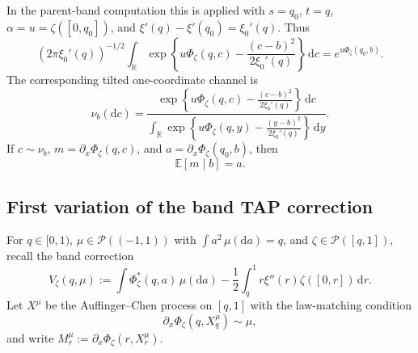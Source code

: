 \documentclass[a4paper,10pt,reqno]{amsart}
\numberwithin{equation}{section}
\newcommand{\dR}{\mathbb{R}}%
\newcommand{\dE}{\mathbb{E}}%
\newcommand{\mc}{\mathcal}
\newcommand{\dd}{\mathrm{d}}
\begin{document}
	In the parent-band computation this is applied with $s=q_0$, $t=q$, $\alpha=u=\zeta([0,q_0])$, and $\xi'(q)-\xi'(q_0)=\xi_0'(q)$.  Thus
	\begin{equation}\label{eq:band-cole-hopf-collapse}
		(2\pi\xi_0'(q))^{-1/2}
		\int_\dR
		\exp\left\{
		u\Phi_\zeta(q,c)-\frac{(c-b)^2}{2\xi_0'(q)}
		\right\}\,\dd c
		=e^{u\Phi_\zeta(q_0,b)} .
	\end{equation}
	The corresponding tilted one-coordinate channel is
	\begin{equation}\label{eq:band-AC-channel}
		\nu_b(\dd c)
		=\frac{
			\exp\left\{
			u\Phi_\zeta(q,c)-\frac{(c-b)^2}{2\xi_0'(q)}
			\right\}\,\dd c
		}{
			\int_\dR
			\exp\left\{
			u\Phi_\zeta(q,y)-\frac{(y-b)^2}{2\xi_0'(q)}
			\right\}\,\dd y
		}.
	\end{equation}
	If $c\sim\nu_b$, $m=\partial_x\Phi_\zeta(q,c)$, and
	$a=\partial_x\Phi_\zeta(q_0,b)$, then
	\begin{equation}\label{eq:band-AC-martingale-channel}
		\dE[m\mid b]=a .
	\end{equation}
	
	
	\subsection{First variation of the band TAP correction}
	
	For $q\in[0,1)$, $\mu\in\mc P((-1,1))$ with $\int a^2\,\mu(\dd a)=q$, and $\zeta\in\mc P([q,1])$, recall the band correction
	\begin{equation}\label{eq:band-correction-V}
		V_\zeta(q,\mu)
		:=\int\Phi_\zeta^*(q,a)\,\mu(\dd a)
		-\frac12\int_q^1 r\xi''(r)\zeta([0,r])\,\dd r .
	\end{equation}
	Let $X^\mu$ be the Auffinger--Chen process on $[q,1]$ with the law-matching condition
	\begin{equation}\label{eq:AC-law-matching}
		\partial_x\Phi_\zeta(q,X_q^\mu)\sim\mu,
	\end{equation}
	and write $M_r^\mu:=\partial_x\Phi_\zeta(r,X_r^\mu)$.
	
\end{document}
